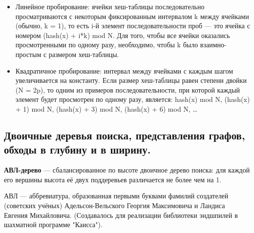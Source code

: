 \documentclass[12pt, a4paper]{article}
\begin{document}
\begin{itemize}
    \item Линейное пробирование: ячейки хеш-таблицы последовательно просматриваются с некоторым фиксированным интервалом k между ячейками (обычно, k = 1), то есть i-й элемент последовательности проб — это ячейка с номером (hash(x) + i*k) mod N. Для того, чтобы все ячейки оказались просмотренными по одному разу, необходимо, чтобы k было взаимно-простым с размером хеш-таблицы.
    \item Квадратичное пробирование: интервал между ячейками с каждым шагом увеличивается на константу. Если размер хеш-таблицы равен степени двойки (N = 2p), то одним из примеров последовательности, при которой каждый элемент будет просмотрен по одному разу, является: hash(x) mod N, (hash(x) + 1) mod N, (hash(x) + 3) mod N, (hash(x) + 6) mod N, …
\end{itemize}

\subsection{Двоичные деревья поиска, представления графов, обходы в глубину и в ширину.}

\textbf{АВЛ-дерево} — сбалансированное по высоте двоичное дерево поиска: для каждой его вершины высота её двух поддеревьев различается не более чем на 1.

АВЛ — аббревиатура, образованная первыми буквами фамилий создателей (советских учёных) Адельсон-Вельского Георгия Максимовича и Ландиса Евгения Михайловича. (Создавалось для реализации библиотеки эндшпилей в шахматной программе "Каисса"{}).

\begin{figure}[h]
\end{figure}

\begin{figure}[h]
\end{figure}
\end{document}
